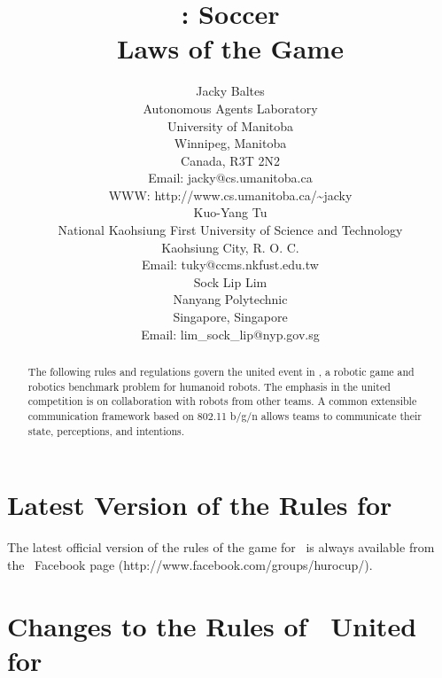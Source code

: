 \documentclass[12pt]{hurocup}
\begin{document}
\title{\HuroCup: Soccer\\
Laws of the Game \thisyear}

\author{Jacky Baltes\\
Autonomous Agents Laboratory\\
University of Manitoba\\
Winnipeg, Manitoba\\
Canada, R3T 2N2\\
Email: jacky@cs.umanitoba.ca\\
WWW: http://www.cs.umanitoba.ca/\~{ }jacky\\[5mm]
Kuo-Yang Tu\\
National Kaohsiung First University of Science and Technology\\
Kaohsiung City, R. O. C.\\
Email: tuky@ccms.nkfust.edu.tw\\[5mm]
Sock Lip Lim\\
Nanyang Polytechnic\\
Singapore, Singapore\\
Email: lim\_sock\_lip@nyp.gov.sg 
}

\maketitle
\begin{abstract}
The following rules and regulations govern the united event in
\HuroCup, a robotic game and robotics benchmark problem for humanoid
robots. The emphasis in the united competition is on collaboration
with robots from other teams. A common extensible communication
framework based on 802.11 b/g/n allows teams to communicate their
state, perceptions, and intentions.
%
\end{abstract}

\section*{Latest Version of the Rules for \HuroCup}
\label{sec:updates}

The latest official version of the rules of the game for \HuroCup\ is
always available from the \HuroCup\ Facebook page
(http://www.facebook.com/groups/hurocup/).

\section*{Changes to the Rules of \HuroCup\ United for \thisyear}
\end{document}
